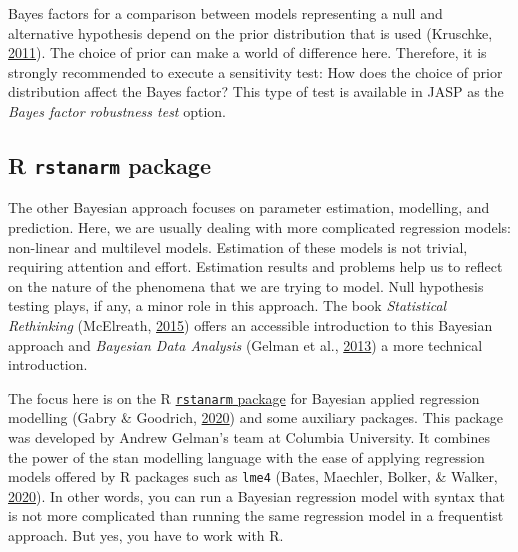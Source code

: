 \documentclass[
  english,
  doc]{apa6}
\begin{document}
Bayes factors for a comparison between models representing a null and alternative hypothesis depend on the prior distribution that is used (Kruschke, \protect\hyperlink{ref-kruschkeBayesianAssessmentNull2011}{2011}). The choice of prior can make a world of difference here. Therefore, it is strongly recommended to execute a sensitivity test: How does the choice of prior distribution affect the Bayes factor? This type of test is available in JASP as the \emph{Bayes factor robustness test} option.

\hypertarget{r-rstanarm-package}{%
\subsection{\texorpdfstring{R \texttt{rstanarm} package}{R rstanarm package}}\label{r-rstanarm-package}}

The other Bayesian approach focuses on parameter estimation, modelling, and prediction. Here, we are usually dealing with more complicated regression models: non-linear and multilevel models. Estimation of these models is not trivial, requiring attention and effort. Estimation results and problems help us to reflect on the nature of the phenomena that we are trying to model. Null hypothesis testing plays, if any, a minor role in this approach. The book \emph{Statistical Rethinking} (McElreath, \protect\hyperlink{ref-McElreathStatisticalRethinkingBayesian2015}{2015}) offers an accessible introduction to this Bayesian approach and \emph{Bayesian Data Analysis} (Gelman et al., \protect\hyperlink{ref-GelmanBayesianDataAnalysis2013}{2013}) a more technical introduction.

The focus here is on the R \href{http://mc-stan.org/rstanarm/index.html}{\texttt{rstanarm} package} for Bayesian applied regression modelling (Gabry \& Goodrich, \protect\hyperlink{ref-R-rstanarm}{2020}) and some auxiliary packages. This package was developed by Andrew Gelman's team at Columbia University. It combines the power of the stan modelling language with the ease of applying regression models offered by R packages such as \texttt{lme4} (Bates, Maechler, Bolker, \& Walker, \protect\hyperlink{ref-R-lme4}{2020}). In other words, you can run a Bayesian regression model with syntax that is not more complicated than running the same regression model in a frequentist approach. But yes, you have to work with R.
\end{document}
